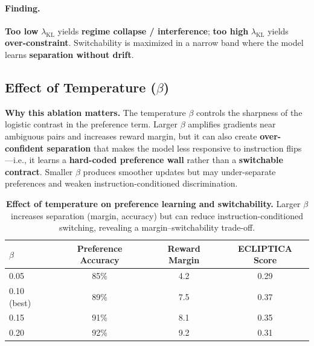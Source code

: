 \vspace{-0.15em}
\paragraph{\textbf{Finding.}}
\textbf{Too low} $\lambda_{\text{KL}}$ yields \textbf{regime collapse / interference}; \textbf{too high} $\lambda_{\text{KL}}$ yields \textbf{over-constraint}.
Switchability is maximized in a narrow band where the model learns \textbf{separation without drift}.

\subsection{Effect of Temperature ($\beta$)}

\vspace{-0.25em}
\noindent
\textbf{Why this ablation matters.}
The temperature $\beta$ controls the sharpness of the logistic contrast in the preference term.
Larger $\beta$ amplifies gradients near ambiguous pairs and increases reward margin, but it can also create \textbf{over-confident separation} that makes the model less responsive to instruction flips---i.e., it learns a \textbf{hard-coded preference wall} rather than a \textbf{switchable contract}.
Smaller $\beta$ produces smoother updates but may under-separate preferences and weaken instruction-conditioned discrimination.

\begin{table}[H]
\centering
\small
\renewcommand{\arraystretch}{1.2}
\begin{tabular}{@{}lccc@{}}
\toprule
\textbf{$\beta$} & \textbf{Preference Accuracy} & \textbf{Reward Margin} & \textbf{ECLIPTICA Score} \\
\midrule
0.05 & 85\% & 4.2 & 0.29 \\ \hline
0.10 (best) & 89\% & 7.5 & 0.37 \\ \hline
0.15 & 91\% & 8.1 & 0.35 \\ \hline
0.20 & 92\% & 9.2 & 0.31 \\
\bottomrule
\end{tabular}
\caption{\textbf{Effect of temperature on preference learning and switchability.} Larger $\beta$ increases separation (margin, accuracy) but can reduce instruction-conditioned switching, revealing a margin--switchability trade-off.}
\label{tab:beta_ablation}
\end{table}


